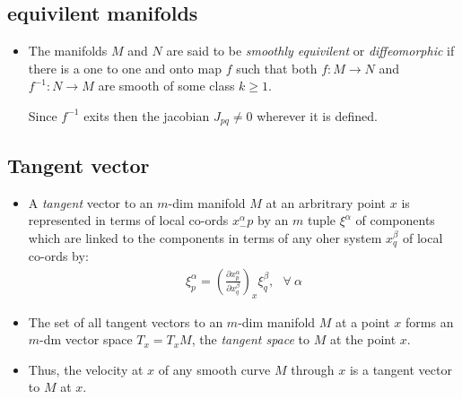 \documentclass[11pt]{article}
\numberwithin{equation}{section}
\begin{document}
\subsection{equivilent manifolds}
\begin{itemize}
  \item The manifolds $M$ and $N$ are said to be \emph{smoothly equivilent} or \emph{diffeomorphic} if there is a one to one and onto map $f$ such that both $f:M \rightarrow N$ and $f^{-1}:N \rightarrow M$ are smooth of some class $k\geq 1$. 

  Since $f^{-1}$ exits then the jacobian $J_{pq} \neq 0 $ wherever it is defined. 
\end{itemize}

\subsection{Tangent vector}
\begin{itemize}
  \item A \emph{tangent} vector to an $m$-dim manifold $M$ at an arbritrary point $x$ is represented in terms of local co-ords $x^{\alpha}_-p$ by an $m$ tuple $\xi^{\alpha}$ of components which are linked to the components in terms of any oher system $x^{\beta}_{q}$ of local co-ords by:
  \begin{align}
  \label{tangent}
    \xi^{\alpha}_{p} = \left(\frac{\partial x^{\alpha}_{p}}{\partial x^{\beta}_{q}}\right)_{x} \xi^{\beta}_{q},~~~\forall~ \alpha
  \end{align}

  \item The set of all tangent vectors to an $m$-dim manifold $M$ at a point $x$ forms an $m$-dm vector space $T_{x} = T_{x}M$, the \emph{tangent space} to $M$ at the point $x$. 

   \item Thus, the velocity at $x$ of any smooth curve $M$ through $x$ is a tangent vector to $M$ at $x$. 
\end{itemize}
\end{document}
